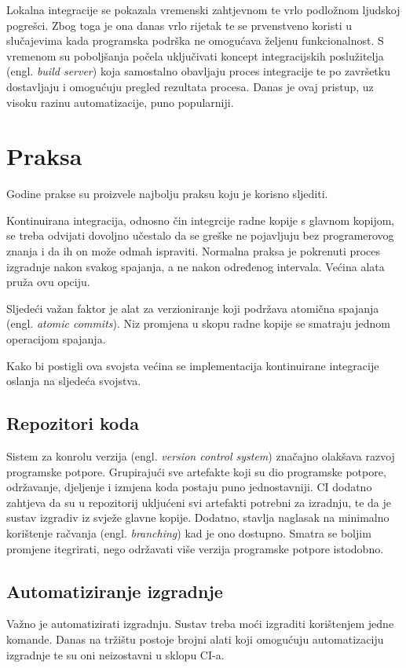 \documentclass[times, utf8, seminar, numeric]{fer}
\newcommand{\eng}[1]{(engl. \textit{#1})}
\begin{document}
Lokalna integracije se pokazala vremenski zahtjevnom te vrlo podložnom ljudskoj pogrešci. Zbog toga je ona danas vrlo rijetak te se prvenstveno koristi u slučajevima kada programska podrška ne omogućava željenu funkcionalnost. S vremenom su poboljšanja počela uključivati koncept integracijskih poslužitelja \eng{build server} koja samostalno obavljaju proces integracije te po završetku dostavljaju i omogućuju pregled rezultata procesa. Danas je ovaj pristup, uz visoku razinu automatizacije, puno popularniji.

\section{Praksa}
Godine prakse su proizvele najbolju praksu koju je korisno sljediti.

Kontinuirana integracija, odnosno čin integrcije radne kopije s glavnom kopijom, se treba odvijati dovoljno učestalo da se greške ne pojavljuju bez programerovog znanja i da ih on može odmah ispraviti. Normalna praksa je pokrenuti proces izgradnje nakon svakog spajanja, a ne nakon određenog intervala. Većina alata pruža ovu opciju.

Sljedeći važan faktor je alat za verzioniranje koji podržava atomična spajanja \eng{atomic commits}. Niz promjena u skopu radne kopije se smatraju jednom operacijom spajanja.

Kako bi postigli ova svojsta većina se implementacija kontinuirane integracije oslanja na sljedeća svojstva.

\subsection{Repozitori koda}
Sistem za konrolu verzija \eng{version control system} značajno olakšava razvoj programske potpore. Grupirajući sve artefakte koji su dio programske potpore, održavanje, djeljenje i izmjena koda postaju puno jednostavniji\citep{wiki:VersionControl}. CI dodatno zahtjeva da su u repozitorij ukljućeni svi artefakti potrebni za izradnju, te da je sustav izgradiv iz svježe glavne kopije. Dodatno, stavlja naglasak na minimalno korištenje račvanja \eng{branching} kad je ono dostupno. Smatra se boljim promjene itegrirati, nego održavati više verzija programske potpore istodobno.

\subsection{Automatiziranje izgradnje}
Važno je automatizirati izgradnju. Sustav treba moći izgraditi korištenjem jedne komande. Danas na tržištu postoje brojni alati koji omogućuju automatizaciju izgradnje te su oni neizostavni u sklopu CI-a.
\end{document}
